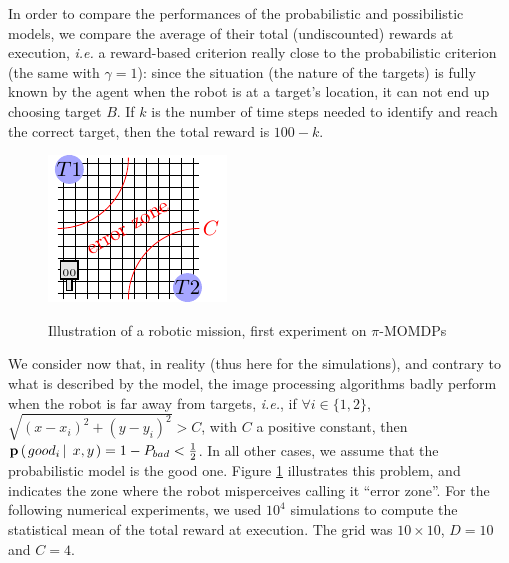 In order to compare the performances 
of the probabilistic and possibilistic models, 
we compare the average of their total (undiscounted) rewards at execution,
\textit{i.e.} a reward-based criterion really close to the probabilistic criterion
(the same with $\gamma=1$):
since the situation 
(the nature of the targets) 
is fully known 
by the agent when the robot 
is at a target's location, 
it can not end up choosing target $B$. 
If $k$ is the number of time steps needed to identify 
and reach the correct target, 
then the total reward is $100-k$. 

\begin{figure} \caption{Illustration of a robotic mission, first experiment on $\pi$-MOMDPs}\centering
\includegraphics[width=0.5\linewidth]{robotgrid.pdf} 
\label{robotgridfig}
\end{figure}

We consider now that, 
in reality (thus here for the simulations),
and contrary to what is described by the model, 
the image processing algorithms badly perform 
when the robot is far away from targets, 
\textit{i.e.}, if $\forall i \in \{1,2\}$, 
$\sqrt{(x-x_i)^2+(y-y_i)^2}>C$, 
with $C$ a positive constant, then
$\textbf{p} \left( \left. good_i \, \right| \left. \, x,y  \right. \right) = 1-P_{bad} < \frac{1}{2}$.  
In all other cases, we assume that 
the probabilistic model is the good one. 
Figure \ref{robotgridfig} illustrates this problem,
and indicates the zone where the robot misperceives
calling it ``error zone''.
For the following numerical experiments,
we used $10^4$ simulations to compute 
the statistical mean of the total reward at execution. 
The grid was $10 \times 10$, $D=10$ and $C=4$. 

